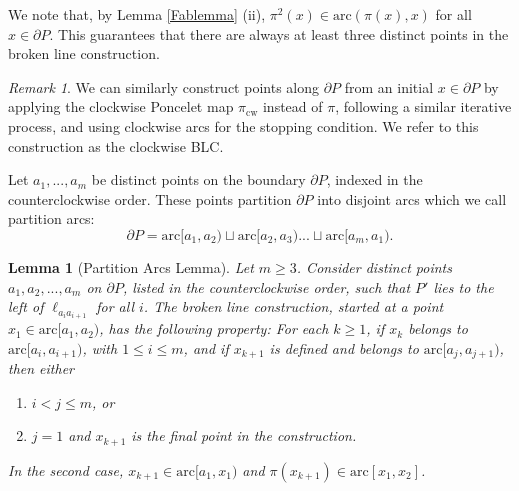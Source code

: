 \documentclass[11pt]{amsart}
\newtheorem{lemma}[theorem]{Lemma}
\theoremstyle{remark}
\newtheorem{remark}[theorem]{Remark}
\numberwithin{equation}{section}
\newcommand{\arc}{\mathrm{arc}}
\newcommand{\cw}{\mathrm{cw}}
\renewcommand{\leq}{\leqslant}
\renewcommand{\geq}{\geqslant}
\begin{document}
We note that, by Lemma \ref{Fablemma} (ii), $\pi^2(x)\in \arc(\pi(x),x)$ for all $x\in \partial P$. This guarantees that
 there are always at least three  distinct points in the broken line construction.

\begin{remark}
We can similarly construct points along $\partial P$  from an initial $x\in \partial P$ by applying the clockwise Poncelet map $\pi_{\cw}$ instead of $\pi$,  following a similar iterative process, and using clockwise arcs for the stopping condition. We refer to this construction as the clockwise  BLC.  
\end{remark}




Let $a_1,...,a_m$ be distinct points on the boundary $\partial P$, indexed in the counterclockwise order. These  points partition  $\partial P$ into disjoint arcs which we call partition arcs:
\[
\partial P=\arc[a_1,a_2)\sqcup \arc[a_2,a_3)...\sqcup \arc[a_m,a_1).
\] 




\begin{lemma}[Partition Arcs Lemma]\label{pockets} Let $m\geq 3$.
Consider distinct points $a_1,a_2,...,a_m$  on  $\partial P$, listed in the counterclockwise order, such that $P'$ lies to the left of  $\ell_{a_ia_{i+1}}$ for all $i$. The broken line construction, started at a point $x_1\in \arc[a_1,a_2)$, has the following property: For each $k\geq 1$, if $x_k$ belongs to $\arc[a_i,a_{i+1})$, with $1\leq i \leq m$, and if $x_{k+1}$ is defined and belongs to $\arc[a_j,a_{j+1})$, then either
\begin{enumerate}[(1)]
\item
 $i<j\leq m$, or
\item 
$j=1$ and  $x_{k+1}$ is the final point in the construction.
\end{enumerate}
In the second case, $x_{k+1}\in \arc[a_1,x_1)$ and $\pi(x_{k+1})\in \arc[x_1,x_2]$.
\end{lemma}
\end{document}
